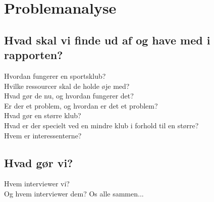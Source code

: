 \chapter{Problemanalyse}\label{ch:ch2label}


\section{Hvad skal vi finde ud af og have med i rapporten?}
Hvordan fungerer en sportsklub?\\
Hvilke ressourcer skal de holde øje med?\\
Hvad gør de nu, og hvordan fungerer det?\\
Er der et problem, og hvordan er det et problem?\\
Hvad gør en større klub?\\
Hvad er der specielt ved en mindre klub i forhold til en større?\\
Hvem er interessenterne?\\

\section{Hvad gør vi?}
Hvem interviewer vi?\\
Og hvem interviewer dem? Os alle sammen...\\


















